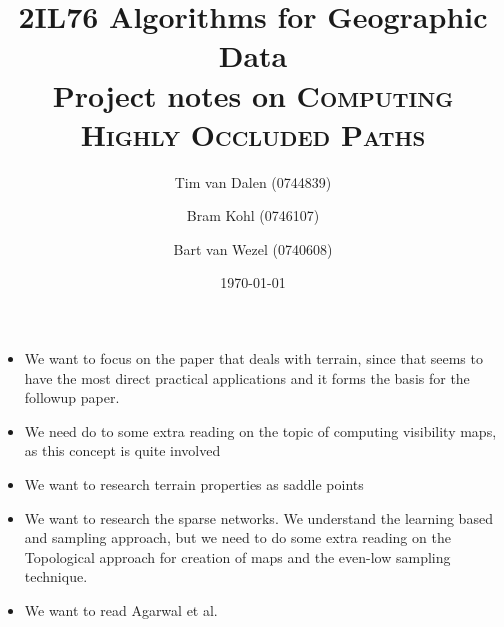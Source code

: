 \documentclass[a4paper,11pt]{article}
\title{
	\Huge{2IL76 Algorithms for Geographic Data}\\
	Project notes on \textsc{Computing Highly Occluded Paths}
}
\author{
	Tim van Dalen (0744839)
	\and
	Bram Kohl (0746107)
	\and
	Bart van Wezel (0740608)
}
\date{\today}
\begin{document}
	\maketitle
	
	\begin{itemize}
		\item We want to focus on the paper that deals with terrain, since that seems to have the most direct practical applications and it forms the basis for the followup paper.
		\item We need do to some extra reading on the topic of computing visibility maps, as this concept is quite involved
		\item We want to research terrain properties as saddle points
		\item We want to research the sparse networks. We understand the  learning based and sampling approach, but we need to do some extra reading on the Topological approach for creation of maps and the even-low sampling technique. 
		\item We want to read Agarwal et al.
	\end{itemize}
\end{document}
